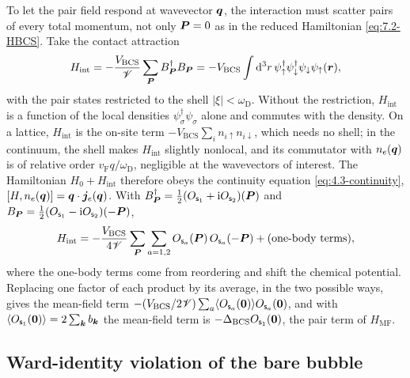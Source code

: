 To let the pair field respond at wavevector $\bm{q}$, the interaction must scatter pairs of every total momentum, not only $\bm{P} = 0$ as in the reduced Hamiltonian \cref{eq:7.2-HBCS}. Take the contact attraction
\begin{equation*}
  H_{\mathrm{int}} = -\frac{V_{\mathrm{BCS}}}{\mathscr{V}}\sum_{\bm{P}}B^\dagger_{\bm{P}}B_{\bm{P}} = -V_{\mathrm{BCS}}\int\mathrm{d}^3r\,\psi^\dagger_\uparrow\psi^\dagger_\downarrow\psi_\downarrow\psi_\uparrow(\bm{r}) ,
\end{equation*}
with the pair states restricted to the shell $|\xi| < \omega_{\mathrm{D}}$. Without the restriction, $H_{\mathrm{int}}$ is a function of the local densities $\psi^\dagger_\sigma\psi_\sigma$ alone and commutes with the density. On a lattice, $H_{\mathrm{int}}$ is the on-site term $-V_{\mathrm{BCS}}\sum_in_{i\uparrow}n_{i\downarrow}$, which needs no shell; in the continuum, the shell makes $H_{\mathrm{int}}$ slightly nonlocal, and its commutator with $n_e(\bm{q})$ is of relative order $v_{\mathrm{F}}q/\omega_{\mathrm{D}}$, negligible at the wavevectors of interest. The Hamiltonian $H_0 + H_{\mathrm{int}}$ therefore obeys the continuity equation \cref{eq:4.3-continuity}, $[H, n_e(\bm{q})] = \bm{q}\cdot\bm{j}_e(\bm{q})$. With $B^\dagger_{\bm{P}} = \frac12(O_{\mathsf{s}_1} + \mathrm{i} O_{\mathsf{s}_2})(\bm{P})$ and $B_{\bm{P}} = \frac12(O_{\mathsf{s}_1} - \mathrm{i} O_{\mathsf{s}_2})(-\bm{P})$,
\begin{equation*}
  H_{\mathrm{int}} = -\frac{V_{\mathrm{BCS}}}{4\mathscr{V}}\sum_{\bm{P}}\sum_{a=1,2}O_{\mathsf{s}_a}(\bm{P})\,O_{\mathsf{s}_a}(-\bm{P}) + (\text{one-body terms}) ,
\end{equation*}
where the one-body terms come from reordering and shift the chemical potential. Replacing one factor of each product by its average, in the two possible ways, gives the mean-field term $-(V_{\mathrm{BCS}}/2\mathscr{V})\sum_a\langle O_{\mathsf{s}_a}(\bm{0})\rangle O_{\mathsf{s}_a}(\bm{0})$, and with $\langle O_{\mathsf{s}_1}(\bm{0})\rangle = 2\sum_{\bm{k}}b_{\bm{k}}$ the mean-field term is $-\Delta_{\mathrm{BCS}}O_{\mathsf{s}_1}(\bm{0})$, the pair term of $H_{\mathrm{MF}}$.

\subsection*{Ward-identity violation of the bare bubble}

